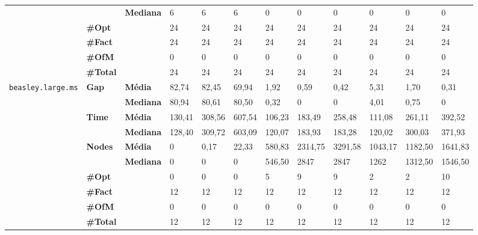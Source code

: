 \begin{table}[]
\begin{adjustbox}{angle=90}
\begin{tabular}{cll|lll|lll|lll}
 & & \textbf{Mediana} & 6 & 6 & 6 & 0 & 0 & 0 & 0 & 0 & 0 \\
\cline{2-12}
 & \textbf{\#Opt} & & 24 & 24 & 24 & 24 & 24 & 24 & 24 & 24 & 24 \\
 & \textbf{\#Fact} & & 24 & 24 & 24 & 24 & 24 & 24 & 24 & 24 & 24 \\
 & \textbf{\#OfM} & & 0 & 0 & 0 & 0 & 0 & 0 & 0 & 0 & 0 \\
 & \textbf{\#Total} & & 24 & 24 & 24 & 24 & 24 & 24 & 24 & 24 & 24 \\
\hline
\multirow{7}{*}{\texttt{beasley.large.ms}} & \multirow{2}{*}{\textbf{Gap}} & \textbf{Média} & 82,74 & 82,45 & 69,94 & 1,92 & 0,59 & 0,42 & 5,31 & 1,70 & 0,31 \\
 & & \textbf{Mediana} & 80,94 & 80,61 & 80,50 & 0,32 & 0 & 0 & 4,01 & 0,75 & 0 \\
\cline{2-12}
 & \multirow{2}{*}{\textbf{Time}} & \textbf{Média} & 130,41 & 308,56 & 607,54 & 106,23 & 183,49 & 258,48 & 111,08 & 261,11 & 392,52 \\
 & & \textbf{Mediana} & 128,40 & 309,72 & 603,09 & 120,07 & 183,93 & 183,28 & 120,02 & 300,03 & 371,93 \\
\cline{2-12}
 & \multirow{2}{*}{\textbf{Nodes}} & \textbf{Média} & 0 & 0,17 & 22,33 & 580,83 & 2314,75 & 3291,58 & 1043,17 & 1182,50 & 1641,83 \\
 & & \textbf{Mediana} & 0 & 0 & 0 & 546,50 & 2847 & 2847 & 1262 & 1312,50 & 1546,50 \\
\cline{2-12}
 & \textbf{\#Opt} & & 0 & 0 & 0 & 5 & 9 & 9 & 2 & 2 & 10 \\
 & \textbf{\#Fact} & & 12 & 12 & 12 & 12 & 12 & 12 & 12 & 12 & 12 \\
 & \textbf{\#OfM} & & 0 & 0 & 0 & 0 & 0 & 0 & 0 & 0 & 0 \\
 & \textbf{\#Total} & & 12 & 12 & 12 & 12 & 12 & 12 & 12 & 12 & 12 \\
	\end{tabular}
	\end{adjustbox}
\end{table}


